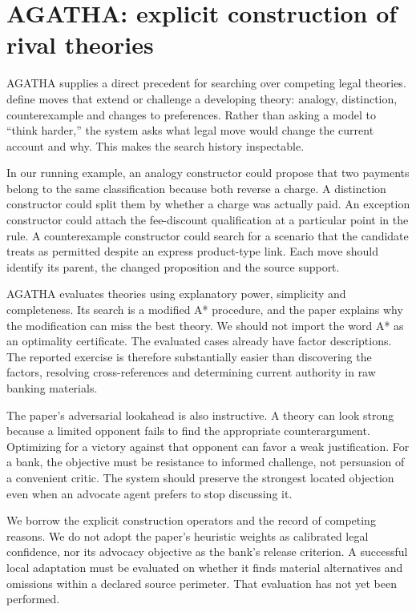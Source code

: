 \documentclass[12pt,a4paper,oneside,openany]{book}
\begin{document}
\section{AGATHA: explicit construction of rival theories}
\label{merge:M05:03}


AGATHA supplies a direct precedent for searching over competing legal theories.
\citet[sections 2--4]{agatha2005} define moves that extend or challenge a developing
theory: analogy, distinction, counterexample and changes to preferences. Rather
than asking a model to ``think harder,'' the system asks what legal move would
change the current account and why. This makes the search history inspectable.

In our running example, an analogy constructor could propose that two payments
belong to the same classification because both reverse a charge. A distinction
constructor could split them by whether a charge was actually paid. An exception
constructor could attach the fee-discount qualification at a particular point in
the rule. A counterexample constructor could search for a scenario that the
candidate treats as permitted despite an express product-type link. Each move
should identify its parent, the changed proposition and the source support.

AGATHA evaluates theories using explanatory power, simplicity and completeness.
Its search is a modified A* procedure, and the paper explains why the modification
can miss the best theory. We should not import the word A* as an optimality
certificate. The evaluated cases already have factor descriptions. The reported
exercise is therefore substantially easier than discovering the factors,
resolving cross-references and determining current authority in raw banking
materials.

The paper's adversarial lookahead is also instructive. A theory can look strong
because a limited opponent fails to find the appropriate counterargument.
Optimizing for a victory against that opponent can favor a weak justification.
For a bank, the objective must be resistance to informed challenge, not persuasion
of a convenient critic. The system should preserve the strongest located
objection even when an advocate agent prefers to stop discussing it.

We borrow the explicit construction operators and the record of competing
reasons. We do not adopt the paper's heuristic weights as calibrated legal
confidence, nor its advocacy objective as the bank's release criterion. A
successful local adaptation must be evaluated on whether it finds material
alternatives and omissions within a declared source perimeter. That evaluation
has not yet been performed.
\end{document}
